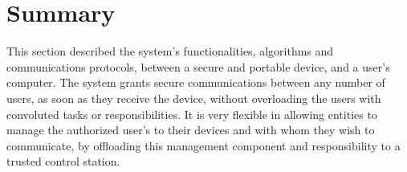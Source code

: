 


\section{Summary}\label{chap:arch:summary}

This section described the system's functionalities, algorithms and communications protocols, between a secure and portable device, and a user's computer.
The system grants secure communications between any number of users, as soon as they receive the device, without overloading the users with convoluted tasks or responsibilities.
It is very flexible in allowing entities to manage the authorized user's to their devices and with whom they wish to communicate, by offloading this management component and responsibility to a trusted control station.
